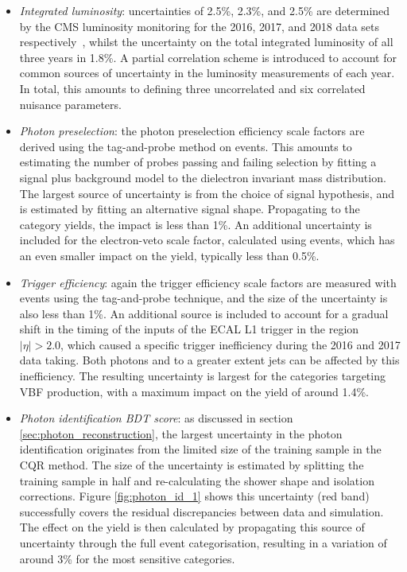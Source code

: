 \begin{itemize}
    \item \textit{Integrated luminosity}: uncertainties of 2.5\%, 2.3\%, and 2.5\% are determined by the CMS luminosity monitoring for the 2016, 2017, and 2018 data sets respectively~\cite{CMS-PAS-LUM-17-001,CMS-PAS-LUM-17-004,CMS-PAS-LUM-18-002}, whilst the uncertainty on the total integrated luminosity of all three years in 1.8\%. A partial correlation scheme is introduced to account for common sources of uncertainty in the luminosity measurements of each year. In total, this amounts to defining three uncorrelated and six correlated nuisance parameters.
    
    \item \textit{Photon preselection}: the photon preselection efficiency scale factors are derived using the tag-and-probe method on \Zee events. This amounts to estimating the number of probes passing and failing selection by fitting a signal plus background model to the dielectron invariant mass distribution. The largest source of uncertainty is from the choice of signal hypothesis, and is estimated by fitting an alternative signal shape. Propagating to the category yields, the impact is less than 1\%. An additional uncertainty is included for the electron-veto scale factor, calculated using \Zmumug events, which has an even smaller impact on the yield, typically less than 0.5\%. 
    
    \item \textit{Trigger efficiency}: again  the trigger efficiency scale factors are measured with \Zee events using the tag-and-probe technique, and the size of the uncertainty is also less than 1\%. An additional source is included to account for a gradual shift in the timing of the inputs of the ECAL L1 trigger in the region $|\eta|>2.0$, which caused a specific trigger inefficiency during the 2016 and 2017 data taking. Both photons and to a greater extent jets can be affected by this inefficiency. The resulting uncertainty is largest for the categories targeting VBF production, with a maximum impact on the yield of around 1.4\%.
    
    \item \textit{Photon identification BDT score}: as discussed in section \ref{sec:photon_reconstruction}, the largest uncertainty in the photon identification originates from the limited size of the training sample in the CQR method. The size of the uncertainty is estimated by splitting the training sample in half and re-calculating the shower shape and isolation corrections. Figure \ref{fig:photon_id_1} shows this uncertainty (red band) successfully covers the residual discrepancies between data and simulation. The effect on the yield is then calculated by propagating this source of uncertainty through the full event categorisation, resulting in a variation of around 3\% for the most sensitive categories. 


\end{itemize}
